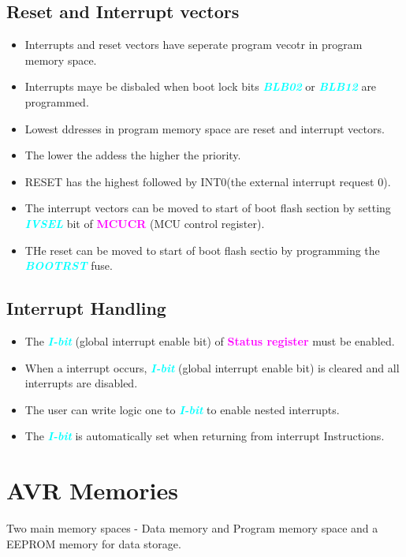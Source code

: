 \documentclass{article}
\newcommand{\bitFormat}[1]{\emph{\textbf{\textcolor{cyan}{#1}}}}
\newcommand{\regFormat}[1]{\textbf{\textcolor{magenta}{#1}}}
\begin{document}
\subsection{Reset and Interrupt vectors}
\begin{itemize}
    \item Interrupts and reset vectors have seperate program vecotr in program memory space.
    \item Interrupts maye be disbaled when boot lock bits \bitFormat{BLB02} or \bitFormat{BLB12} are programmed.
    \item Lowest ddresses in program memory space are reset and interrupt vectors.
    \item The lower the addess the higher the priority.
    \item RESET has the highest followed by INT0(the external interrupt request 0).
    \item The interrupt vectors can be moved to start of boot flash section by setting \bitFormat{IVSEL} bit of \regFormat{MCUCR} (MCU control register).
    \item THe reset can be moved to start of boot flash sectio by programming the \bitFormat{BOOTRST} fuse.
\end{itemize}

\subsection{Interrupt Handling}
\begin{itemize}
    \item The \bitFormat{I-bit} (global interrupt enable bit) of \regFormat{Status register} must be enabled.
    \item When a interrupt occurs, \bitFormat{I-bit} (global interrupt enable bit) is cleared and all interrupts are disabled.
    \item The user can write logic one to \bitFormat{I-bit} to enable nested interrupts.
    \item The \bitFormat{I-bit} is automatically set when returning from interrupt Instructions.
\end{itemize}


\section{AVR Memories}
\quad Two main memory spaces - Data memory and Program memory space and a EEPROM memory for data storage.
\end{document}
